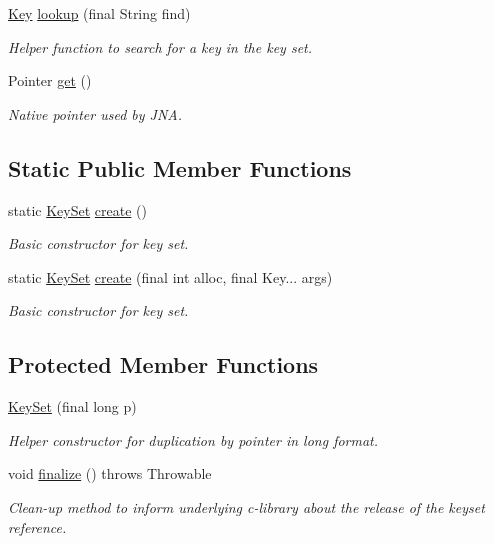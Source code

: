 \begin{DoxyCompactItemize}
\hyperlink{classorg_1_1libelektra_1_1Key}{Key} \hyperlink{classorg_1_1libelektra_1_1KeySet_a69921726091c9a775bb8ece1f1e3a858}{lookup} (final String find)
\begin{DoxyCompactList}\small\item\em Helper function to search for a key in the key set. \end{DoxyCompactList}\item 
Pointer \hyperlink{classorg_1_1libelektra_1_1KeySet_abf3f028c9c3b88a47aa9d67a5c8e95da}{get} ()
\begin{DoxyCompactList}\small\item\em Native pointer used by J\+NA. \end{DoxyCompactList}\end{DoxyCompactItemize}
\subsection*{Static Public Member Functions}
\begin{DoxyCompactItemize}
\item 
static \hyperlink{classorg_1_1libelektra_1_1KeySet}{Key\+Set} \hyperlink{classorg_1_1libelektra_1_1KeySet_ac0ba4b88bef5e731b586f4ca63b9ab7f}{create} ()
\begin{DoxyCompactList}\small\item\em Basic constructor for key set. \end{DoxyCompactList}\item 
static \hyperlink{classorg_1_1libelektra_1_1KeySet}{Key\+Set} \hyperlink{classorg_1_1libelektra_1_1KeySet_a441d0e45a150a6fd5f75be00ec42338d}{create} (final int alloc, final Key... args)
\begin{DoxyCompactList}\small\item\em Basic constructor for key set. \end{DoxyCompactList}\end{DoxyCompactItemize}
\subsection*{Protected Member Functions}
\begin{DoxyCompactItemize}
\item 
\hyperlink{classorg_1_1libelektra_1_1KeySet_a72507fbeb96bfb90e44562e0a8e70331}{Key\+Set} (final long p)
\begin{DoxyCompactList}\small\item\em Helper constructor for duplication by pointer in long format. \end{DoxyCompactList}\item 
\mbox{\label{classorg_1_1libelektra_1_1KeySet_ad11eed8c4aeea5b9af381e0185b3a097}} 
void \hyperlink{classorg_1_1libelektra_1_1KeySet_ad11eed8c4aeea5b9af381e0185b3a097}{finalize} ()  throws Throwable 	
\begin{DoxyCompactList}\small\item\em Clean-\/up method to inform underlying c-\/library about the release of the keyset reference. \end{DoxyCompactList}\end{DoxyCompactItemize}

